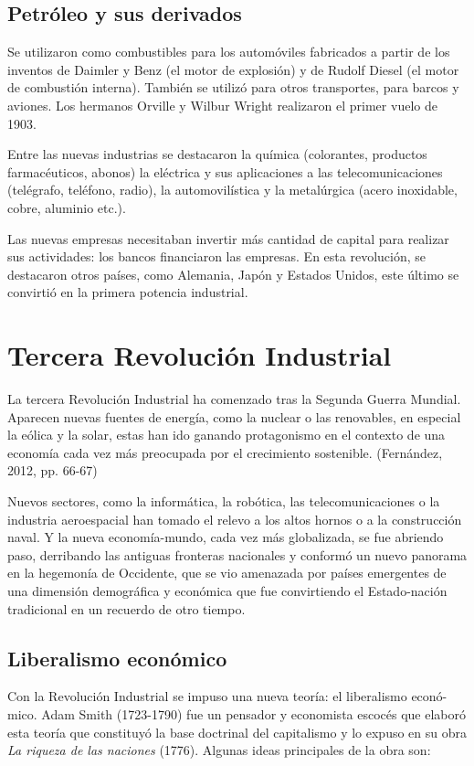\documentclass{article}
\begin{document}
{  \subsection*{\normalsize Petróleo y sus derivados}
  Se utilizaron como combustibles para los automóviles fabricados a partir de los inventos de Daimler y Benz (el motor de explosión) y de Rudolf Diesel (el motor de combustión interna). También se utilizó para otros transportes, para barcos y aviones. Los hermanos Orville y Wilbur Wright realizaron el primer vuelo de 1903.

  Entre las nuevas industrias se destacaron la química (colorantes, productos farmacéuticos, abonos) la eléctrica y sus aplicaciones a las telecomunicaciones (telégrafo, teléfono, radio), la automovilística y la metalúrgica (acero inoxidable, cobre, aluminio etc.).

  Las nuevas empresas necesitaban invertir más cantidad de capital para realizar sus actividades: los bancos financiaron las empresas. En esta revolución, se destacaron otros países, como Alemania, Japón y Estados Unidos, este último se convirtió en la primera potencia industrial.


  \section{Tercera Revolución Industrial}
  La tercera Revolución Industrial ha comenzado tras la Segunda Guerra Mundial. Aparecen nuevas fuentes de energía, como la nuclear o las renovables, en especial la eólica y la solar, estas han ido ganando protagonismo en el contexto de una economía cada vez más preocupada por el crecimiento sostenible. (Fernández, 2012, pp. 66-67)

  Nuevos sectores, como la informática, la robótica, las telecomunicaciones o la industria aeroespacial han tomado el relevo a los altos hornos o a la construcción naval. Y la nueva economía-mundo, cada vez más globalizada, se fue abriendo paso, derribando las antiguas fronteras nacionales y conformó un nuevo panorama en la hegemonía de Occidente, que se vio amenazada por países emergentes de una dimensión demográfica y económica que fue convirtiendo el Estado-nación tradicional en un recuerdo de otro tiempo.

  \subsection*{Liberalismo económico}

  Con la Revolución Industrial se impuso una nueva teoría: el liberalismo econó-\\mico. Adam Smith (1723-1790) fue un pensador y economista escocés que elaboró esta teoría que constituyó la base doctrinal del capitalismo y lo expuso en su obra \textit{La riqueza de las naciones} (1776). Algunas ideas principales de la obra son:

}
\end{document}
